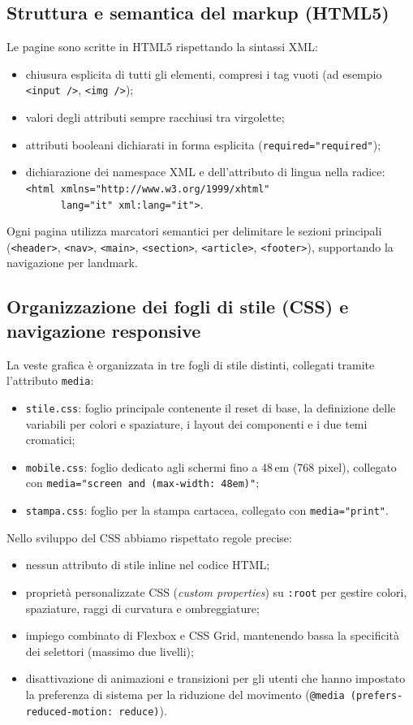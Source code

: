 \documentclass[a4paper,11pt]{article}
\begin{document}
\subsection{Struttura e semantica del markup (HTML5)}
Le pagine sono scritte in HTML5 rispettando la sintassi XML:
\begin{itemize}
    \item chiusura esplicita di tutti gli elementi, compresi i tag vuoti (ad esempio \texttt{<input />}, \texttt{<img />});
    \item valori degli attributi sempre racchiusi tra virgolette;
    \item attributi booleani dichiarati in forma esplicita (\texttt{required="required"});
    \item dichiarazione dei namespace XML e dell'attributo di lingua nella radice:\\
    \mbox{}\quad\texttt{<html xmlns="http://www.w3.org/1999/xhtml"}\\
    \mbox{}\quad\texttt{~~~~~~lang="it" xml:lang="it">}.
\end{itemize}

Ogni pagina utilizza marcatori semantici per delimitare le sezioni principali (\texttt{<header>}, \texttt{<nav>}, \texttt{<main>}, \texttt{<section>}, \texttt{<article>}, \texttt{<footer>}), supportando la navigazione per landmark.

\subsection{Organizzazione dei fogli di stile (CSS) e navigazione responsive}
La veste grafica è organizzata in tre fogli di stile distinti, collegati tramite l'attributo \texttt{media}:
\begin{itemize}
    \item \texttt{stile.css}: foglio principale contenente il reset di base, la definizione delle variabili per colori e spaziature, i layout dei componenti e i due temi cromatici;
    \item \texttt{mobile.css}: foglio dedicato agli schermi fino a 48\,em (768 pixel), collegato con \texttt{media="screen and (max-width: 48em)"};
    \item \texttt{stampa.css}: foglio per la stampa cartacea, collegato con \texttt{media="print"}.
\end{itemize}

Nello sviluppo del CSS abbiamo rispettato regole precise:
\begin{itemize}
    \item nessun attributo di stile inline nel codice HTML;
    \item proprietà personalizzate CSS (\textit{custom properties}) su \texttt{:root} per gestire colori, spaziature, raggi di curvatura e ombreggiature;
    \item impiego combinato di Flexbox e CSS Grid, mantenendo bassa la specificità dei selettori (massimo due livelli);
    \item disattivazione di animazioni e transizioni per gli utenti che hanno impostato la preferenza di sistema per la riduzione del movimento (\texttt{@media (prefers-reduced-motion: reduce)}).
\end{itemize}
\end{document}
